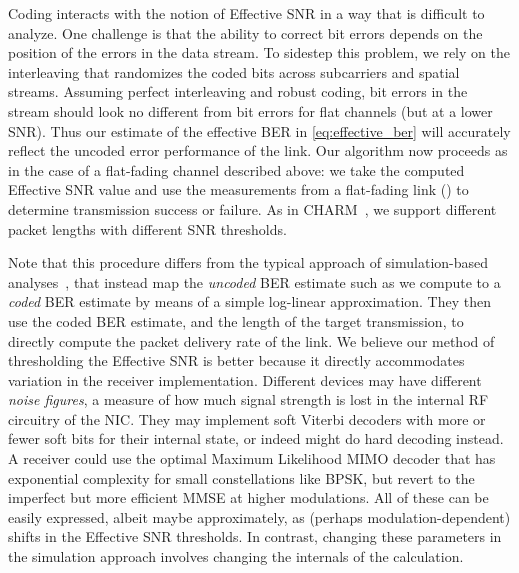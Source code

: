 Coding interacts with the notion of Effective SNR in a way that is difficult to analyze. One challenge is that the ability to correct bit errors depends on the position of the errors in the data stream. To sidestep this problem, we rely on the interleaving that randomizes the coded bits across subcarriers and spatial streams. Assuming perfect interleaving and robust coding, bit errors in the stream should look no different from bit errors for flat channels (but at a lower SNR). Thus our estimate of the effective BER in \eqref{eq:effective_ber} will accurately reflect the uncoded error performance of the link. Our algorithm now proceeds as in the case of a flat-fading channel described above: we take the computed Effective SNR value and use the measurements from a flat-fading link () to determine transmission success or failure. As in CHARM~\cite{Judd_CHARM}, we support different packet lengths with different SNR thresholds.

Note that this procedure differs from the typical approach of simulation-based analyses~\cite{Kant_fla, Liu_EESM, Nortel_3g}, that instead map the \emph{uncoded} BER estimate such as we compute to a \emph{coded} BER estimate by means of a simple log-linear approximation. They then use the coded BER estimate, and the length of the target transmission, to directly compute the packet delivery rate of the link. We believe our method of thresholding the Effective SNR is better because it directly accommodates variation in the receiver implementation. Different devices may have different \emph{noise figures}, a measure of how much signal strength is lost in the internal RF circuitry of the NIC\@. They may implement soft Viterbi decoders with more or fewer soft bits for their internal state, or indeed might do hard decoding instead. A receiver could use the optimal Maximum Likelihood MIMO decoder that has exponential complexity for small constellations like BPSK, but revert to the imperfect but more efficient MMSE at higher modulations. All of these can be easily expressed, albeit maybe approximately, as (perhaps modulation-dependent) shifts in the Effective SNR thresholds. In contrast, changing these parameters in the simulation approach involves changing the internals of the calculation.

